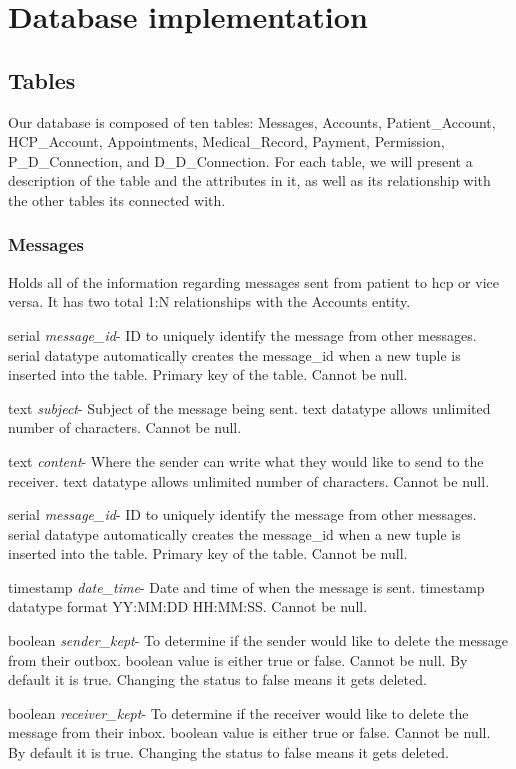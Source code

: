 \documentclass[10pt]{report}
\begin{document}
\section{Database implementation}
\subsection{Tables}
Our database is composed of ten tables: Messages, Accounts, Patient\_Account, HCP\_Account, Appointments, Medical\_Record, Payment, Permission, P\_D\_Connection, and D\_D\_Connection.  For each table, we will present a description of the table and the attributes in it, as well as its relationship with the other tables its connected with.

\subsubsection{Messages}
Holds all of the information regarding messages sent from patient to hcp or vice versa. It has two total 1:N relationships with the Accounts entity.

\begin{description}
\item serial \textit{message\_id}- ID to uniquely identify the message from other messages. serial datatype automatically creates the message\_id when a new tuple is inserted into the table.  Primary key of the table.  Cannot be null.
\item text \textit{subject}- Subject of the message being sent. text datatype allows unlimited number of characters.  Cannot be null.
\item text \textit{content}- Where the sender can write what they would like to send to the receiver.  text datatype allows unlimited number of characters.  Cannot be null.
\item serial \textit{message\_id}- ID to uniquely identify the message from other messages. serial datatype automatically creates the message\_id when a new tuple is inserted into the table.  Primary key of the table.  Cannot be null.
\item timestamp \textit{date\_time}- Date and time of when the message is sent.  timestamp datatype format YY:MM:DD HH:MM:SS.  Cannot be null.
\item boolean \textit{sender\_kept}- To determine if the sender would like to delete the message from their outbox.  boolean value is either true or false.  Cannot be null.  By default it is true.  Changing the status to false means it gets deleted.
\item boolean \textit{receiver\_kept}- To determine if the receiver would like to delete the message from their inbox.  boolean value is either true or false.  Cannot be null.  By default it is true.  Changing the status to false means it gets deleted.
\end{description}
\end{document}
